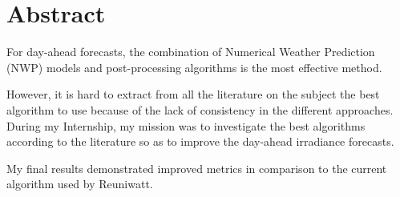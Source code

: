 \section*{Abstract}

For day-ahead forecasts, the combination of Numerical Weather Prediction (NWP) models and post-processing algorithms is the most effective method.

However, it is hard to extract from all the literature on the subject the best algorithm to use because of the lack of consistency in the different approaches.\\ 

During my Internship, my mission was to investigate the best algorithms according to the literature so as to improve the day-ahead irradiance forecasts. 

My final results demonstrated improved metrics in comparison to the current algorithm used by Reuniwatt.